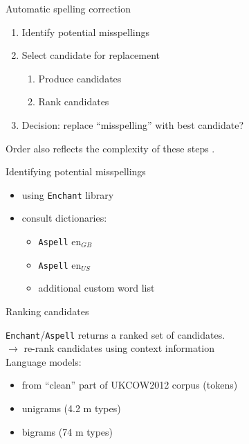 \begin{frame}
  {Automatic spelling correction}

  \begin{enumerate}
  \item Identify potential misspellings
  \item Select candidate for replacement\label{select}
    \begin{enumerate}
    \item Produce candidates
    \item Rank candidates 
    \end{enumerate}
  \item Decision: replace ``misspelling'' with best candidate?\label{decide}
  \end{enumerate}


Order also reflects the complexity of these steps .

\end{frame}


\begin{frame}{Identifying potential misspellings}

  \begin{itemize}
  \item using \texttt{Enchant} library
  \item consult dictionaries: 
    \begin{itemize}
    \item \texttt{Aspell} en$_{GB}$
    \item \texttt{Aspell} en$_{US}$
    \item additional custom word list
    \end{itemize}
  \end{itemize}
  
\end{frame}


\begin{frame}{Ranking candidates}

\texttt{Enchant}/\texttt{Aspell} returns a ranked set of candidates.\\[1ex]

$\rightarrow$ re-rank candidates using context information\\[2ex] 


Language models: 
  \begin{itemize}
  \item from ``clean'' part of UKCOW2012 corpus (tokens)
  \item unigrams (4.2 m types)
  \item bigrams (74 m types)
  \end{itemize}  
\end{frame}



